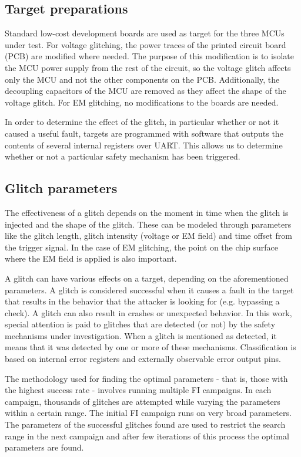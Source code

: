 \documentclass[a4paper, 10pt]{IEEEtran}
\begin{document}
\subsection{Target preparations}

Standard low-cost development boards are used as target for the three MCUs under test. For voltage glitching, the power traces of the printed circuit board (PCB) are modified where needed. The purpose of this modification is to isolate the MCU power supply from the rest of the circuit, so the voltage glitch affects only the MCU and not the other components on the PCB. Additionally, the decoupling capacitors of the MCU are removed as they affect the shape of the voltage glitch. For EM glitching, no modifications to the boards are needed.

In order to determine the effect of the glitch, in particular whether or not it caused a useful fault, targets are programmed with software that outputs the contents of several internal registers over UART. This allows us to determine whether or not a particular safety mechanism has been triggered. 

\subsection{Glitch parameters}

The effectiveness of a glitch depends on the moment in time when the glitch is injected and the shape of the glitch. These can be modeled through parameters like the glitch length, glitch intensity (voltage or EM field) and time offset from the trigger signal. In the case of EM glitching, the point on the chip surface where the EM field is applied is also important.

A glitch can have various effects on a target, depending on the aforementioned parameters. A glitch is considered successful when it causes a fault in the target that results in the behavior that the attacker is looking for (e.g. bypassing a check). A glitch can also result in crashes or unexpected behavior. In this work, special attention is paid to glitches that are detected (or not) by the safety mechanisms under investigation. When a glitch is mentioned as detected, it means that it was detected by one or more of these mechanisms. Classification is based on internal error registers and externally observable error output pins.

The methodology used for finding the optimal parameters - that is, those with the highest success rate - involves running multiple FI campaigns. In each campaign, thousands of glitches are attempted while varying the parameters within a certain range. The initial FI campaign runs on very broad parameters. The parameters of the successful glitches found are used to restrict the search range in the next campaign and after few iterations of this process the optimal parameters are found.
\end{document}
